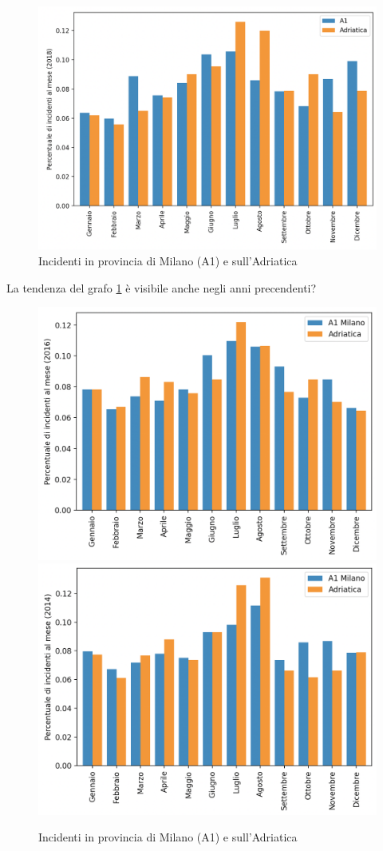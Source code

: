 \documentclass[a4paper]{report}
\begin{document}
\begin{figure}
    \includegraphics[width=\linewidth]{../src/incidenti/incidenti_aci/autostrade/milano_adriatica.png}
    \caption{Incidenti in provincia di Milano (A1) e sull'Adriatica}
    \label{fig:milano-adriatica}
\end{figure}

La tendenza del grafo \ref{fig:milano-adriatica} è visibile anche negli anni precendenti?

\begin{figure}
    \includegraphics[width=0.5\linewidth]{../src/incidenti/incidenti_aci/autostrade/milano_adriatica_2016.png}
    \includegraphics[width=0.5\linewidth]{../src/incidenti/incidenti_aci/autostrade/milano_adriatica_2014.png}
    \caption{Incidenti in provincia di Milano (A1) e sull'Adriatica}
    \label{fig:milano-adriatica_tendenza}
\end{figure}
\end{document}

